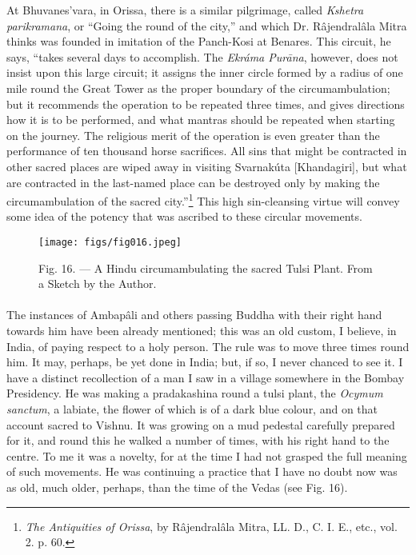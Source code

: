 \documentclass[a4paper, 11pt, oneside, polutonikogreek, english]{article}
\begin{document}
At Bhuvanes'vara, in Orissa, there is a similar pilgrimage, called \emph{Kshetra parikramana}, or ``Going the round of the city,'' and which Dr. Râjendralâla Mitra thinks was founded in imitation of the Panch-Kosi at Benares. This circuit, he says, ``takes several days to accomplish. The \emph{Ekráma Purāna}, however, does not insist upon this large circuit; it assigns the inner circle formed by a radius of one mile round the Great Tower as the proper boundary of the circumambulation; but it recommends the operation to be repeated three times, and gives directions how it is to be performed, and what mantras should be repeated when starting on the journey. The religious merit of the operation is even greater than the performance of ten thousand horse sacrifices. All sins that might be contracted in other sacred places are wiped away in visiting Svarnakúta [Khandagiri], but what are contracted in the last-named place can be destroyed only by making the circumambulation of the sacred city.''\footnote{\emph{The Antiquities of Orissa}, by Râjendralâla Mitra, LL. D., C. I. E., etc., vol. 2. p. 60.} This high sin-cleansing virtue will convey some idea of the potency that was ascribed to these circular movements.

\begin{figure}[H]
\centering
\texttt{[image: figs/fig016.jpeg]}
\caption[Fig. 16. --- A Hindu circumambulating the sacred Tulsi Plant.]{Fig. 16. --- A Hindu circumambulating the sacred Tulsi Plant. From a Sketch by the Author.}
\end{figure}
\paragraph{}
The instances of Ambapâli and others passing Buddha with their right hand towards him have been already mentioned; this was an old custom, I believe, in India, of paying respect to a holy person. The rule was to move three times round him. It may, perhaps, be yet done in India; but, if so, I never chanced to see it. I have a distinct recollection of a man I saw in a village somewhere in the Bombay Presidency. He was making a pradakashina round a tulsi plant, the \emph{Ocymum sanctum}, a labiate, the flower of which is of a dark blue colour, and on that account sacred to Vishnu. It was growing on a mud pedestal carefully prepared for it, and round this he walked a number of times, with his right hand to the centre. To me it was a novelty, for at the time I had not grasped the full meaning of such movements. He was continuing a practice that I have no doubt now was as old, much older, perhaps, than the time of the Vedas (see Fig. 16).
\end{document}
